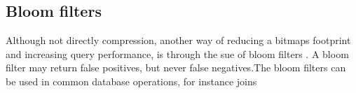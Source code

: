 \subsection{Bloom filters}
\label{sub:Bloom filters}
Although not directly compression, another way of reducing a bitmaps footprint and increasing query performance, is through the sue of bloom filters \cite{Bloom1970-nr}. A bloom filter may return false positives, but never false negatives.The bloom filters can be used in common database operations, for instance joins \cite{x}



